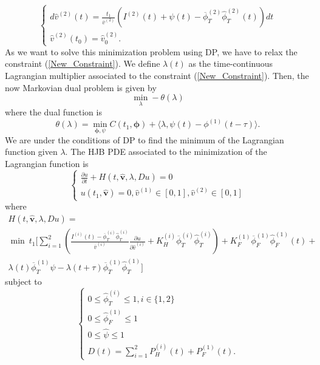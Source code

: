 \begin{equation}
\begin{cases}
d\hat{v}^{(2)}(t)=\frac{t_1}{\overline{v}^{(2)}}\left(I^{(2)}(t)+\psi(t)-\overline{\phi}_T^{(2)}\hat{\phi}_T^{(2)}(t)\right)dt\\
\hat{v}^{(2)}(t_0)=\hat{v}_0^{(2)}.
\end{cases}
\end{equation}
As we want to solve this minimization problem using DP, we have to relax the constraint (\ref{New_Constraint}). We define $\lambda(t)$ as the time-continuous Lagrangian multiplier associated to the constraint (\ref{New_Constraint}). Then, the now Markovian dual problem is given by
\begin{equation}
\min_{\lambda}-\theta(\lambda)
\end{equation}
where the dual function is
\begin{equation}
\theta(\lambda)=\min_{\bm{\phi},\psi}C(t_1,\bm{\phi})+\langle\lambda,\psi(t)-\phi^{(1)}(t-\tau)\rangle.
\end{equation}
We are under the conditions of DP to find the minimum of the Lagrangian function given $\lambda$. The HJB PDE associated to the minimization of the Lagrangian function is
\begin{equation}
\begin{cases}
\frac{\partial u}{\partial t}+H(t,\hat{\bm{v}},\lambda,Du)=0\\
u(t_1,\hat{\bm{v}})=0,\hat{v}^{(1)}\in[0,1],\hat{v}^{(2)}\in[0,1]
\end{cases}
\end{equation}
where
\begin{multline}
H(t,\hat{\bm{v}},\lambda,Du)=\\
\min\ t_1\Bigg[\sum_{i=1}^2\left(\frac{I^{(i)}(t)-\overline{\phi}_T^{(i)}\hat{\phi}_T^{(i)}}{\overline{v}^{(i)}}\frac{\partial u}{\partial \hat{v}^{(i)}}+K_H^{(i)}\overline{\phi}_T^{(i)}\hat{\phi}_T^{(i)}\right)+K_F^{(1)}\overline{\phi}_F^{(1)}\hat{\phi}_F^{(1)}(t)+\\
\lambda(t)\overline{\phi}^{(1)}_T\psi-\lambda(t+\tau)\overline{\phi}^{(1)}_T\hat{\phi}^{(1)}_T\Bigg]
\label{Hamiltonian_4}
\end{multline}
subject to
\begin{equation}
\begin{cases}
0\leq\hat{\phi}^{(i)}_T\leq1,i\in\{1,2\}\\
0\leq\hat{\phi}^{(1)}_F\leq1\\
0\leq\hat{\psi}\leq1\\
D(t)=\sum_{i=1}^2P_H^{(i)}(t)+P_F^{(1)}(t).
\end{cases}
\end{equation}

